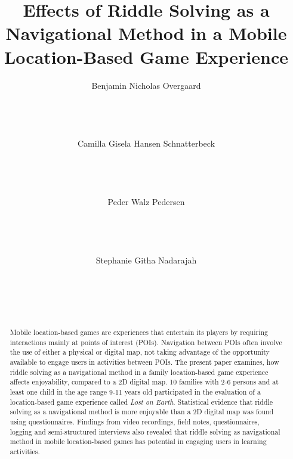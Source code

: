 \documentclass{sigchi}
\begin{document}
\title{Effects of Riddle Solving as a Navigational Method in a Mobile Location-Based Game Experience}

\author{
  \alignauthor Benjamin Nicholas Overgaard\\
    \\
    \\
        \\
    \\
  \alignauthor Camilla Gisela Hansen Schnatterbeck\\
\\
    \\
        \\
    \\ 
  \alignauthor Peder Walz Pedersen\\
\\
    \\
        \\
    \\
      \alignauthor Stephanie Githa Nadarajah\\
\\
    \\
        \\
    \\
}

\maketitle

\begin{abstract}
Mobile location-based games are experiences that entertain its players by requiring interactions mainly at points of interest (POIs). Navigation between POIs often involve the use of either a physical or digital map, not taking advantage of the opportunity available to engage users in activities between POIs. The present paper examines, how riddle solving as a navigational method in a family location-based game experience affects enjoyability, compared to a 2D digital map. 10 families with 2-6 persons and at least one child in the age range 9-11 years old participated in the evaluation of a location-based game experience called \textit{Lost on Earth}. Statistical evidence that riddle solving as a navigational method is more enjoyable than a 2D digital map was found using questionnaires. Findings from video recordings, field notes, questionnaires, logging and semi-structured interviews also revealed that riddle solving as navigational method in mobile location-based games has potential in engaging users in learning activities. 
\end{abstract}
\end{document}
